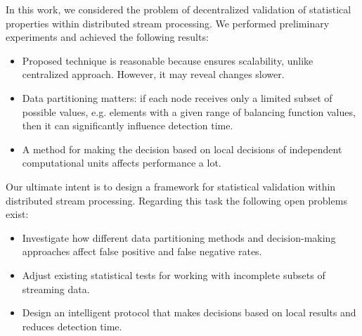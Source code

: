 \label {fs-short-conclusion}

In this work, we considered the problem of decentralized validation of statistical properties within distributed stream processing. We performed preliminary experiments and achieved the following results:
\begin{itemize}
    \item Proposed technique is reasonable because ensures scalability, unlike centralized approach. However, it may reveal changes slower.
    \item Data partitioning matters: if each node receives only a limited subset of possible values, e.g. elements with a given range of balancing function values, then it can significantly influence detection time.
    \item A method for making the decision based on local decisions of independent computational units affects performance a lot.
\end{itemize}

Our ultimate intent is to design a framework for statistical validation within distributed stream processing. Regarding this task the following open problems exist:

\begin{itemize}
    \item Investigate how different data partitioning methods and decision-making approaches affect false positive and false negative rates.
    \item Adjust existing statistical tests for working with incomplete subsets of streaming data.
    \item Design an intelligent protocol that makes decisions based on local results and reduces detection time.
\end{itemize}